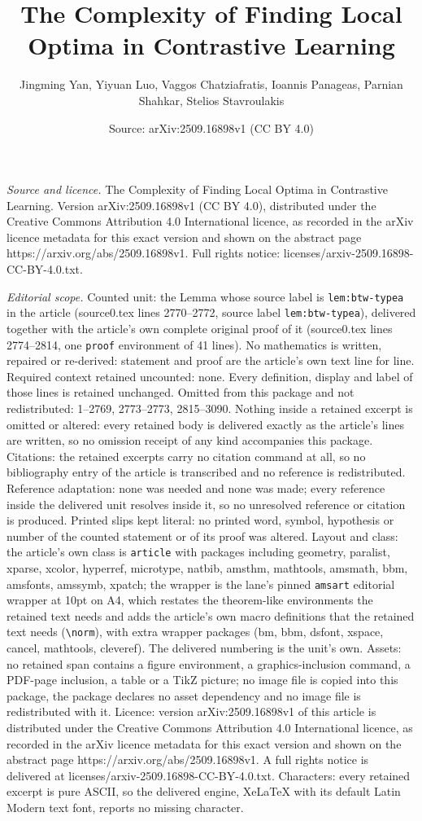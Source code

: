 \documentclass[10pt,a4paper]{amsart}
\title[The Complexity of Finding Local Optima in Contrastive Learni]{The Complexity of Finding Local Optima in Contrastive Learning}
\author{Jingming Yan, Yiyuan Luo, Vaggos Chatziafratis, Ioannis Panageas, Parnian Shahkar, Stelios Stavroulakis}
\date{Source: arXiv:2509.16898v1 (CC BY 4.0)}
\begin{document}
\maketitle

\noindent\emph{Source and licence.} The Complexity of Finding Local Optima in Contrastive Learning. Version arXiv:2509.16898v1 (CC BY 4.0), distributed under the Creative Commons Attribution 4.0 International licence, as recorded in the arXiv licence metadata for this exact version and shown on the abstract page https://arxiv.org/abs/2509.16898v1. Full rights notice: licenses/arxiv-2509.16898-CC-BY-4.0.txt.\par\smallskip

\noindent\textit{Editorial scope.} Counted unit: the Lemma whose source label is \texttt{lem:btw-typea} in the article (source0.tex lines 2770--2772, source label \texttt{lem:btw-typea}), delivered together with the article's own complete original proof of it (source0.tex lines 2774--2814, one \texttt{proof} environment of 41 lines). No mathematics is written, repaired or re-derived: statement and proof are the article's own text line for line. Required context retained uncounted: none. Every definition, display and label of those lines is retained unchanged. Omitted from this package and not redistributed: 1--2769, 2773--2773, 2815--3090. Nothing inside a retained excerpt is omitted or altered: every retained body is delivered exactly as the article's lines are written, so no omission receipt of any kind accompanies this package. Citations: the retained excerpts carry no citation command at all, so no bibliography entry of the article is transcribed and no reference is redistributed. Reference adaptation: none was needed and none was made; every reference inside the delivered unit resolves inside it, so no unresolved reference or citation is produced. Printed slips kept literal: no printed word, symbol, hypothesis or number of the counted statement or of its proof was altered. Layout and class: the article's own class is \texttt{article} with packages including geometry, paralist, xparse, xcolor, hyperref, microtype, natbib, amsthm, mathtools, amsmath, bbm, amsfonts, amssymb, xpatch; the wrapper is the lane's pinned \texttt{amsart} editorial wrapper at 10pt on A4, which restates the theorem-like environments the retained text needs and adds the article's own macro definitions that the retained text needs (\texttt{\textbackslash norm}), with extra wrapper packages (bm, bbm, dsfont, xspace, cancel, mathtools, cleveref). The delivered numbering is the unit's own. Assets: no retained span contains a figure environment, a graphics-inclusion command, a PDF-page inclusion, a table or a TikZ picture; no image file is copied into this package, the package declares no asset dependency and no image file is redistributed with it. Licence: version arXiv:2509.16898v1 of this article is distributed under the Creative Commons Attribution 4.0 International licence, as recorded in the arXiv licence metadata for this exact version and shown on the abstract page https://arxiv.org/abs/2509.16898v1. A full rights notice is delivered at licenses/arxiv-2509.16898-CC-BY-4.0.txt. Characters: every retained excerpt is pure ASCII, so the delivered engine, XeLaTeX with its default Latin Modern text font, reports no missing character.
\end{document}
